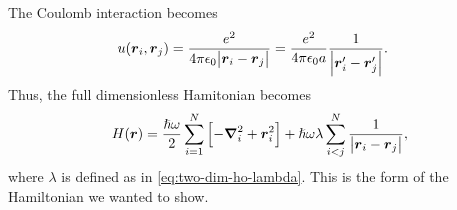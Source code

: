         The Coulomb interaction becomes
        \begin{align}
            u(\boldsymbol{r}_i, \boldsymbol{r}_j)
            &= \frac{e^2}{4\pi\epsilon_0 \abs{\boldsymbol{r}_i - \boldsymbol{r}_j}}
            = \frac{e^2}{4\pi \epsilon_0 a}
            \frac{1}{\abs{\boldsymbol{r}_i' - \boldsymbol{r}_j'}}.
        \end{align}
        Thus, the full dimensionless Hamitonian becomes
        \begin{align}
            H(\boldsymbol{r})
            = \frac{\hslash\omega}{2} \sum_{i = 1}^{N}\left[ 
                -\boldsymbol{\nabla}^2_i
                + \boldsymbol{r}^2_i
             \right]
            + \hslash \omega \lambda
            \sum_{i < j}^{N} \frac{1}{\abs{\boldsymbol{r}_i - \boldsymbol{r}_j}},
        \end{align}
        where $\lambda$ is defined as in \autoref{eq:two-dim-ho-lambda}.
        This is the form of the Hamiltonian we wanted to show.

